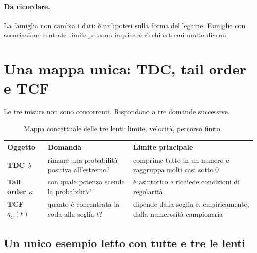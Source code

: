 \documentclass[11pt,a4paper]{article}
\newcommand{\Ricorda}{\paragraph{Da ricordare.}}
\begin{document}
\Ricorda La famiglia non cambia i dati: è un'ipotesi sulla forma del legame.
Famiglie con associazione centrale simile possono implicare rischi estremi
molto diversi.

\section{Una mappa unica: TDC, tail order e TCF}

Le tre misure non sono concorrenti. Rispondono a tre domande successive.

\begin{figure}[ht]
\centering
{}
\caption{Mappa concettuale delle tre lenti: limite, velocità, percorso finito.}
\label{fig:three-measures}
\end{figure}

\begin{center}
\begin{tabularx}{\textwidth}{>{\bfseries}p{2.4cm}X X}
\toprule
Oggetto & Domanda & Limite principale\\
\midrule
TDC $\lambda$ & rimane una probabilità positiva all'estremo? & comprime tutto in un numero e raggruppa molti casi sotto $0$\\
Tail order $\kappa$ & con quale potenza scende la probabilità? & è asintotico e richiede condizioni di regolarità\\
TCF $q_C(t)$ & quanto è concentrata la coda alla soglia $t$? & dipende dalla soglia e, empiricamente, dalla numerosità campionaria\\
\bottomrule
\end{tabularx}
\end{center}

\subsection*{Un unico esempio letto con tutte e tre le lenti}
\end{document}
